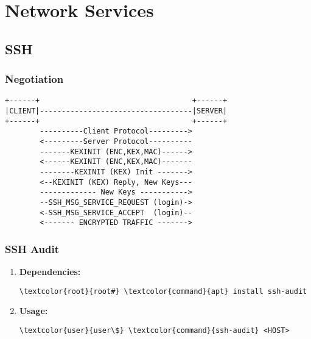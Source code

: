 \documentclass[10pt, a4paper, onecolumn, openany]{book} %
\begin{document}
\chapter{Network Services}
\section{SSH}
\subsection{Negotiation}
\begin{verbatim}
+------+                                   +------+
|CLIENT|-----------------------------------|SERVER|
+------+                                   +------+
        ----------Client Protocol--------->
        <---------Server Protocol----------
        -------KEXINIT (ENC,KEX,MAC)------>
        <------KEXINIT (ENC,KEX,MAC)-------
        --------KEXINIT (KEX) Init ------->
        <--KEXINIT (KEX) Reply, New Keys---
        ------------- New Keys ----------->
        --SSH_MSG_SERVICE_REQUEST (login)->
        <-SSH_MSG_SERVICE_ACCEPT  (login)--
        <------- ENCRYPTED TRAFFIC ------->
\end{verbatim}
\subsection{SSH Audit}
\begin{enumerate}
    \item \textbf{Dependencies:}
\begin{Verbatim}[commandchars=\\\{\}]
\textcolor{root}{root#} \textcolor{command}{apt} install ssh-audit
\end{Verbatim}   
    \item \textbf{Usage:}
\begin{Verbatim}[commandchars=\\\{\}]
\textcolor{user}{user\$} \textcolor{command}{ssh-audit} <HOST>
\end{Verbatim}       
\end{enumerate}
\end{document}
